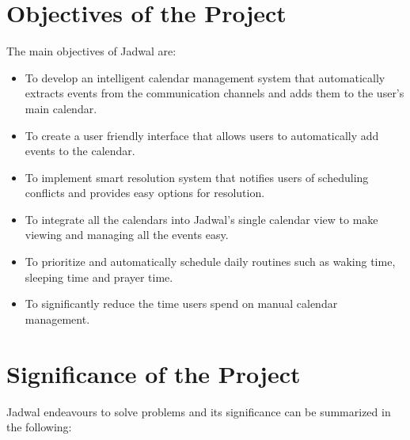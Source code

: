 \documentclass[12pt,a4paper]{article}
\begin{document}
\section{Objectives of the Project}

The main objectives of Jadwal are:

\begin{itemize}
    \item To develop an intelligent calendar management system that automatically extracts events from the communication channels and adds them to the user's main calendar.
    \item To create a user friendly interface that allows users to automatically add events to the calendar.
    \item To implement smart resolution system that notifies users of scheduling conflicts and provides easy options for resolution.
    \item To integrate all the calendars into Jadwal's single calendar view to make viewing and managing all the events easy.
    \item To prioritize and automatically schedule daily routines such as waking time, sleeping time and prayer time.
    \item To significantly reduce the time users spend on manual calendar management.
\end{itemize}

\section{Significance of the Project}

Jadwal endeavours to solve problems and its significance can be summarized in the following:
\end{document}
